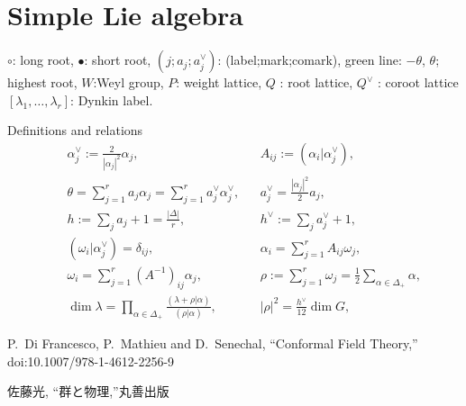 \documentclass[12pt]{article}
\newcommand{\hc}{h^{\vee}}
\newcommand{\alc}{\alpha^{\vee}}
\newcommand{\ac}{a^{\vee}}
\begin{document}
\section*{Simple Lie algebra}
$\circ$: long root, $\bullet$: short root, $(j;a_j;a^{\vee}_j)$:
 (label;mark;comark), green line: $-\theta$,    $\theta$; highest root,
$W$:Weyl group, $P$: weight lattice,
$Q$ : root lattice, $Q^{\vee}$ : coroot lattice
$[\lambda_1,\dots,\lambda_r]$: Dynkin label.

Definitions and relations
\begin{align*}
 &&\alc_j:=\frac{2}{|\alpha_j|^2}\alpha_j,
 &&A_{ij}:=(\alpha_{i}|\alc_j),\\
 &&\theta=\sum_{j=1}^{r}a_{j}\alpha_j=\sum_{j=1}^{r}\ac_j\alc_j,
 &&\ac_{j}=\frac{|\alpha_j|^2}{2}a_{j},\\
 &&h:=\sum_{j}a_j+1=\frac{|\Delta|}{r},
 &&\hc:=\sum_{j}\ac_j+1,\\
 &&(\omega_i| \alc_j)=\delta_{ij},
 &&\alpha_i=\sum_{j=1}^{r} A_{ij}\omega_j,\\
 &&\omega_i=\sum_{j=1}^{r} (A^{-1})_{ij}\alpha_j,
 &&\rho:=\sum_{j=1}^{r}\omega_j=\frac12\sum_{\alpha\in\Delta_+}\alpha,\\
 &&\dim \lambda =
      \prod_{\alpha\in\Delta_{+}}\frac{(\lambda+\rho|\alpha)}{(\rho|\alpha)},
 &&|\rho|^2= \frac{\hc}{12}\dim G,
\end{align*}

\begin{thebibliography}{99}
P.~Di Francesco, P.~Mathieu and D.~Senechal,
``Conformal Field Theory,''
doi:10.1007/978-1-4612-2256-9
\begin{CJK}{UTF8}{ipxm}佐藤光, ``群と物理,''丸善出版\end{CJK}
\end{thebibliography}
\newpage
%
\end{document}

